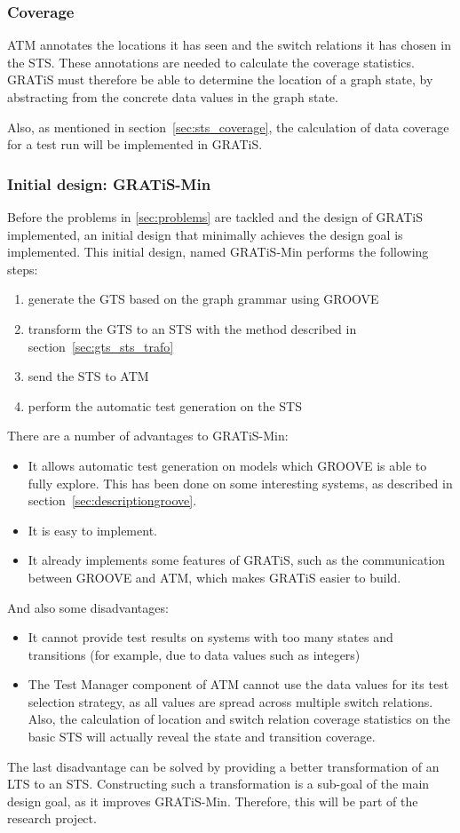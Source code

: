 \subsubsection{Coverage}
ATM annotates the locations it has seen and the switch relations it has chosen in the STS. These annotations are needed to calculate the coverage statistics. GRATiS must therefore be able to determine the location of a graph state, by abstracting from the concrete data values in the graph state.

Also, as mentioned in section~\ref{sec:sts_coverage}, the calculation of data coverage for a test run will be implemented in GRATiS.

\subsubsection{Initial design: GRATiS-Min}\label{sec:init_design}
Before the problems in \ref{sec:problems} are tackled and the design of GRATiS implemented, an initial design that minimally achieves the design goal is implemented. This initial design, named GRATiS-Min performs the following steps:
\begin{enumerate}
  \item generate the GTS based on the graph grammar using GROOVE
  \item transform the GTS to an STS with the method described in section~\ref{sec:gts_sts_trafo}
  \item send the STS to ATM
  \item perform the automatic test generation on the STS
\end{enumerate}

There are a number of advantages to GRATiS-Min:
\begin{itemize}
  \item It allows automatic test generation on models which GROOVE is able to fully explore. This has been done on some interesting systems, as described in section~\ref{sec:descriptiongroove}.
  \item It is easy to implement.
  \item It already implements some features of GRATiS, such as the communication between GROOVE and ATM, which makes GRATiS easier to build.
\end{itemize}
And also some disadvantages:
\begin{itemize}
  \item It cannot provide test results on systems with too many states and transitions (for example, due to data values such as integers)
  \item The Test Manager component of ATM cannot use the data values for its test selection strategy, as all values are spread across multiple switch relations. Also, the calculation of location and switch relation coverage statistics on the basic STS will actually reveal the state and transition coverage.
\end{itemize}
The last disadvantage can be solved by providing a better transformation of an LTS to an STS. Constructing such a transformation is a sub-goal of the main design goal, as it improves GRATiS-Min. Therefore, this will be part of the research project.

